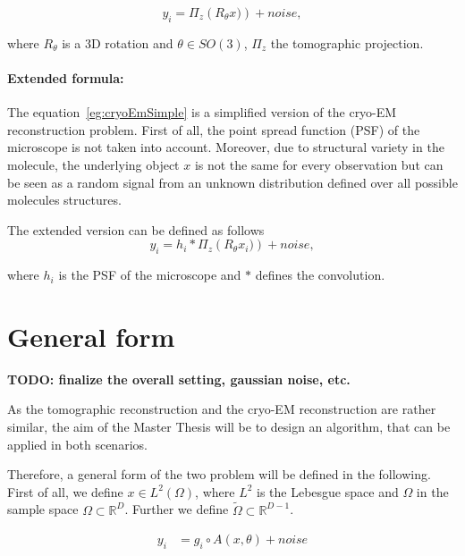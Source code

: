 \begin{equation}
    \label{eg:cryoEmSimple}
    y_i = \Pi_z \left( R_{\theta} x) \right) + noise,
\end{equation}

where $R_{\theta}$ is a 3D rotation and $\theta \in SO(3)$, $\Pi_z$ the tomographic projection.

\paragraph{Extended formula:} 
The equation~\ref{eg:cryoEmSimple} is a simplified version of the cryo-EM reconstruction problem.
First of all, the point spread function (PSF) of the microscope is not taken into account.
Moreover, due to structural variety in the molecule, the underlying object $x$ is not the same 
for every observation but can be seen as a random signal from an unknown distribution defined over all possible molecules structures.

The extended version can be defined as follows
\begin{equation}
    \label{eg:cryoEmExtended}
    y_i = h_i * \Pi_z \left( R_{\theta} x_i) \right) + noise,
\end{equation}

where $h_i$ is the PSF of the microscope and $*$ defines the convolution.


\section{General form}

\textbf{TODO: finalize the overall setting, gaussian noise, etc.}

As the tomographic reconstruction and the cryo-EM reconstruction are rather similar, 
the aim of the Master Thesis will be to design an algorithm, that can be applied in both scenarios.

Therefore, a general form of the two problem will be defined in the following.
First of all, we define $x \in L^2(\Omega)$, where $L^2$ is the Lebesgue space and $\Omega$
in the sample space $\Omega \subset \mathbb{R}^D$. Further we define $\tilde{\Omega} \subset \mathbb{R}^{D-1}$.


\begin{equation}
    \begin{aligned}
        y_i &= g_i \circ A(x, \theta) + noise \\
    \end{aligned}
\end{equation}

